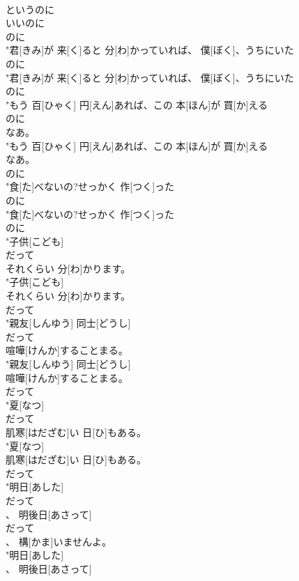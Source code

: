 \documentclass[8pt]{extreport}
\begin{document}
\begin{CJK}{UTF8}{min}
\\	というのに 
\\	いいのに	
\\	のに
\\	"君[きみ]が 来[く]ると 分[わ]かっていれば、 僕[ぼく]、うちにいた
\\	のに
\\	"君[きみ]が 来[く]ると 分[わ]かっていれば、 僕[ぼく]、うちにいた
\\	のに
\\	"もう 百[ひゃく] 円[えん]あれば、この 本[ほん]が 買[か]える
\\	のに
\\	なあ。
\\	"もう 百[ひゃく] 円[えん]あれば、この 本[ほん]が 買[か]える
\\	なあ。
\\	のに
\\	"食[た]べないの?せっかく 作[つく]った
\\	のに
\\	"食[た]べないの?せっかく 作[つく]った
\\	のに
\\	"子供[こども]
\\	だって
\\	それくらい 分[わ]かります。
\\	"子供[こども]
\\	それくらい 分[わ]かります。
\\	だって
\\	"親友[しんゆう] 同士[どうし]
\\	だって
\\	喧嘩[けんか]することまる。
\\	"親友[しんゆう] 同士[どうし]
\\	喧嘩[けんか]することまる。
\\	だって
\\	"夏[なつ]
\\	だって
\\	肌寒[はだざむ]い 日[ひ]もある。
\\	"夏[なつ]
\\	肌寒[はだざむ]い 日[ひ]もある。
\\	だって
\\	"明日[あした]
\\	だって
\\	、 明後日[あさって]
\\	だって
\\	、 構[かま]いませんよ。
\\	"明日[あした]
\\	、 明後日[あさって]

\end{CJK}
\end{document}
